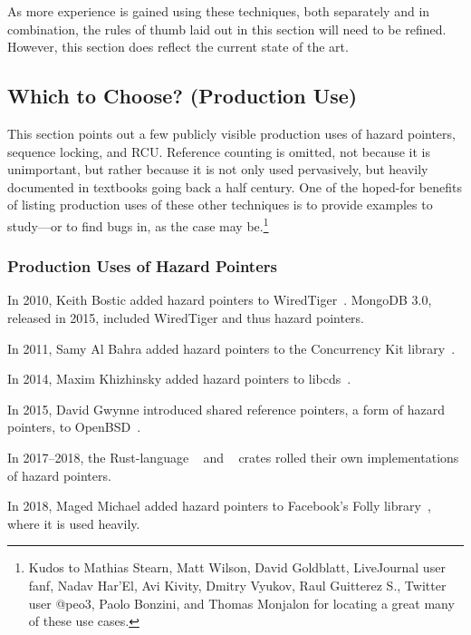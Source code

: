 As more experience is gained using these techniques, both separately
and in combination, the rules of thumb laid out in this section will
need to be refined.
However, this section does reflect the current state of the art.

\subsection{Which to Choose? (Production Use)}
\label{sec:defer:Which to Choose? (Production Use)}

This section points out a few publicly visible production uses of
hazard pointers, sequence locking, and RCU\@.
Reference counting is omitted, not because it is unimportant, but rather
because it is not only used pervasively, but heavily documented in textbooks
going back a half century.
One of the hoped-for benefits of listing production uses of these other
techniques is to provide examples to study---or to find bugs in, as
the case may be.\footnote{
	Kudos to Mathias Stearn, Matt Wilson, David Goldblatt, LiveJournal
	user fanf, Nadav Har'El, Avi Kivity, Dmitry Vyukov, Raul Guitterez
	S., Twitter user @peo3, Paolo Bonzini, and Thomas Monjalon for
	locating a great many of these use cases.}

\subsubsection{Production Uses of Hazard Pointers}
\label{sec:defer:Production Uses of Hazard Pointers}

In 2010, Keith Bostic added hazard pointers to
WiredTiger~\cite{KeithBostic2010WiredTigerhazptr}.
MongoDB 3.0, released in 2015, included WiredTiger and thus hazard pointers.

In 2011, Samy Al Bahra added hazard pointers to the Concurrency Kit
library~\cite{SamyAlBahra2011ckhp}.

In 2014, Maxim Khizhinsky added hazard pointers to
libcds~\cite{MaximKhizhinsky2014libcdsHazptr}.

In 2015, David Gwynne introduced shared reference pointers, a form
of hazard pointers, to OpenBSD~\cite{DavidGwynne2015srp}.

In 2017--2018, the Rust-language
~\cite{MichalVaner2018arc-swapHazptr} and
~\cite{crates.io.user.ticki2017concHazptr}
crates rolled their own implementations of hazard pointers.

In 2018, Maged Michael added hazard pointers to Facebook's Folly
library~\cite{MagedMichael2018FollyHazptr}, where it is used heavily.

